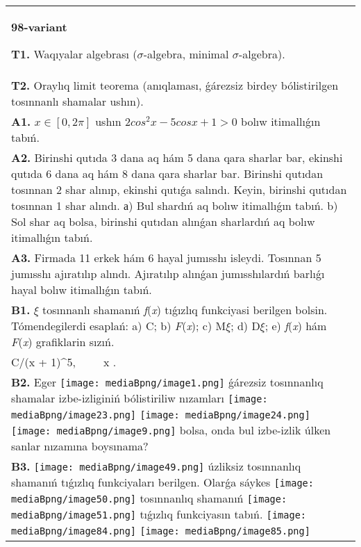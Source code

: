 \documentclass{article}
\begin{document}
\begin{tabular}{m{17cm}}
\textbf{98-variant}
\newline

\textbf{T1.} Waqıyalar algebrası ($\sigma$-algebra, minimal $\sigma$-algebra).
 \\
\textbf{T2.} Oraylıq limit teorema (anıqlaması, ǵárezsiz birdey bólistirilgen tosınnanlı shamalar ushın).
 \\
\textbf{A1.} $x\in \left[ 0,2\pi  \right]$ ushın $2co{{s}^{2}}x-5cosx+1>0$ bolıw itimallıǵın tabıń.
 \\
\textbf{A2.} Birinshi qutıda 3 dana aq hám 5 dana qara sharlar bar, ekinshi qutıda 6 dana aq hám 8 dana qara sharlar bar. Birinshi qutıdan tosınnan 2 shar alınıp, ekinshi qutıǵa salındı. Keyin, birinshi qutıdan tosınnan 1 shar alındı. а) Bul shardıń aq bolıw itimallıǵın tabıń. b) Sol shar aq bolsa, birinshi qutıdan alınǵan sharlardıń aq bolıw itimallıǵın tabıń.
 \\
\textbf{A3.} Firmada 11 erkek hám 6 hayal jumısshı isleydi. Tosınnan 5 jumısshı ajıratılıp alındı. Ajıratılıp alınǵan jumısshılardıń barlıǵı hayal bolıw itimallıǵın tabıń.
 \\
\textbf{B1.} $\xi$ tosınnanlı shamanıń \emph{f}(\emph{x}) tıǵızlıq funkciyasi berilgen bolsin. Tómendegilerdi esaplań: a) C; b) \emph{F}(\emph{x}); c) M$\xi$; d) D$\xi$; e) \emph{f}(\emph{x}) hám \emph{F}(\emph{x}) grafiklarin sızıń.\(f(x) = \left\{ \begin{matrix}
\ \ \ \ \ \ \ \ 0,\ \ \ \ \ \ x < 0, \\
C/(x + 1)^{5},\ \ \ \ \ x \geq 0.\ \ 
\end{matrix} \right.\ \)
 \\
\textbf{B2.} Eger \texttt{[image: mediaBpng/image1.png]} ǵárezsiz tosınnanlıq shamalar izbe-izliginiń bólistiriliw nızamları
\texttt{[image: mediaBpng/image23.png]} \texttt{[image: mediaBpng/image24.png]} \texttt{[image: mediaBpng/image9.png]}
bolsa, onda bul izbe-izlik úlken sanlar nızamına boysınama?
 \\
\textbf{B3.} \texttt{[image: mediaBpng/image49.png]} úzliksiz tosınnanlıq shamanıń tıǵızlıq funkciyaları berilgen. Olarǵa sáykes \texttt{[image: mediaBpng/image50.png]} tosınnanlıq shamanıń \texttt{[image: mediaBpng/image51.png]} tıǵızlıq funkciyasın tabıń. \texttt{[image: mediaBpng/image84.png]} \texttt{[image: mediaBpng/image85.png]}

\end{tabular}
\end{document}
